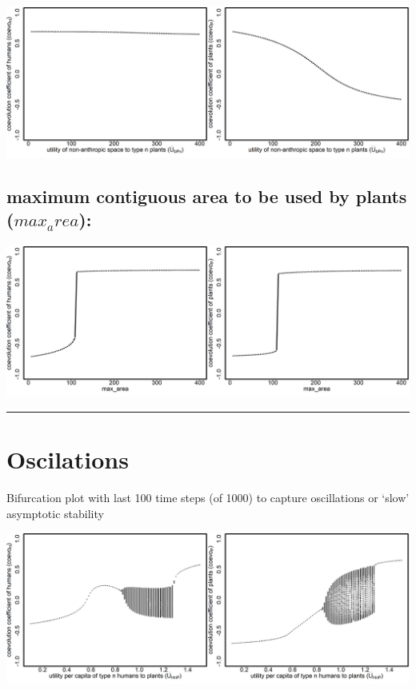 \documentclass[
]{book}
\begin{document}
\includegraphics[width=1\linewidth]{plots/2_exp_utility_other_to_type_n_plants_bifurcationPlotPair}

\hypertarget{maximum-contiguous-area-to-be-used-by-plants-max_area}{%
\subsection{\texorpdfstring{maximum contiguous area to be used by plants (\(max_area\)):}{maximum contiguous area to be used by plants (max\_area):}}\label{maximum-contiguous-area-to-be-used-by-plants-max_area}}

\includegraphics[width=1\linewidth]{plots/2_exp_max_area_bifurcationPlotPair}

\begin{center}\rule{0.5\linewidth}{0.5pt}\end{center}

\hypertarget{oscilations}{%
\section{Oscilations}\label{oscilations}}

Bifurcation plot with last 100 time steps (of 1000) to capture oscillations or `slow' asymptotic stability

\includegraphics[width=1\linewidth]{plots/2_exp_utility_per_capita_type_n_humans_to_plants_oscillation_bifurcationPlotPair}
\end{document}
